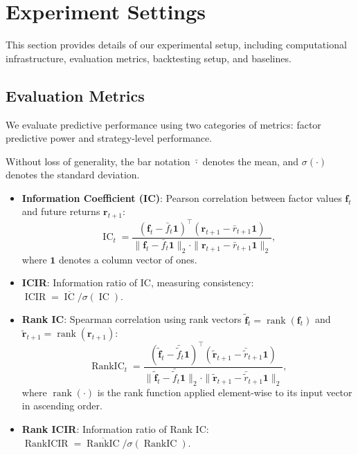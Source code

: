 \section{Experiment Settings}
\label{sec:appendix_experiment_details}

This section provides details of our experimental setup, including computational infrastructure, evaluation metrics, backtesting setup, and baselines.

\subsection{Evaluation Metrics}
\label{appendix:A.2}

We evaluate predictive performance using two categories of metrics: factor predictive power and strategy-level performance.

Without loss of generality, the bar notation $\bar{\cdot}$ denotes the mean, and $\sigma(\cdot)$ denotes the standard deviation.

\begin{itemize}
    \setlength{\itemsep}{-2pt}
    \setlength{\parsep}{0pt}
    \setlength{\topsep}{0pt}
    \setlength{\partopsep}{0pt} 
    \item \textbf{Information Coefficient (IC)}: Pearson correlation between factor values $\mathbf{f}_t$ and future returns $\mathbf{r}_{t+1}$:
    \begin{equation*}
        \operatorname{IC}_t = \frac{(\mathbf{f}_t - \bar{f}_t \mathbf{1})^\top (\mathbf{r}_{t+1} - \bar{r}_{t+1} \mathbf{1})}{\|\mathbf{f}_t - \bar{f}_t \mathbf{1}\|_2 \cdot \|\mathbf{r}_{t+1} - \bar{r}_{t+1} \mathbf{1}\|_2},
    \end{equation*}
    where $\mathbf{1}$ denotes a column vector of ones.
    
    \item \textbf{ICIR}: Information ratio of IC, measuring consistency: $\operatorname{ICIR} = \overline{\operatorname{IC}} / \sigma(\operatorname{IC})$.
    
    \item \textbf{Rank IC}: Spearman correlation using rank vectors $\tilde{\mathbf{f}}_t = \operatorname{rank}(\mathbf{f}_t)$ and $\tilde{\mathbf{r}}_{t+1} = \operatorname{rank}(\mathbf{r}_{t+1})$:
    \begin{equation*}
        \operatorname{RankIC}_t = \frac{(\tilde{\mathbf{f}}_t - \bar{\tilde{f}}_t \mathbf{1})^\top (\tilde{\mathbf{r}}_{t+1} - \bar{\tilde{r}}_{t+1} \mathbf{1})}{\|\tilde{\mathbf{f}}_t - \bar{\tilde{f}}_t \mathbf{1}\|_2 \cdot \|\tilde{\mathbf{r}}_{t+1} - \bar{\tilde{r}}_{t+1} \mathbf{1}\|_2},
    \end{equation*}
    where $\operatorname{rank}(\cdot)$ is the rank function applied element-wise to its input vector in ascending order.
    
    \item \textbf{Rank ICIR}: Information ratio of Rank IC: $\operatorname{RankICIR} = \overline{\operatorname{RankIC}} / \sigma(\operatorname{RankIC})$.
\end{itemize}

